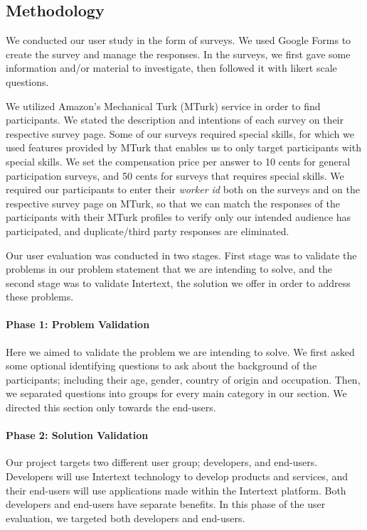 \subsection{Methodology}

We conducted our user study in the form of surveys. We used Google Forms to create the survey and manage the responses. In the surveys, we first gave some information and/or material to investigate, then followed it with likert scale questions.

We utilized Amazon's Mechanical Turk (MTurk) service in order to find participants. We stated the description and intentions of each survey on their respective survey page. Some of our surveys required special skills, for which we used features provided by MTurk that enables us to only target participants with special skills. We set the compensation price per answer to 10 cents for general participation surveys, and 50 cents for surveys that requires special skills. We required our participants to enter their \textit{worker id} both on the surveys and on the respective survey page on MTurk, so that we can match the responses of the participants with their MTurk profiles to verify only our intended audience has participated, and duplicate/third party responses are eliminated.

Our user evaluation was conducted in two stages. First stage was to validate the problems in our problem statement that we are intending to solve, and the second stage was to validate Intertext, the solution we offer in order to address these problems. 

\paragraph{Phase 1: Problem Validation}

Here we aimed to validate the problem we are intending to solve. We first asked some optional identifying questions to ask about the background of the participants; including their age, gender, country of origin and occupation. Then, we separated questions into groups for every main category in our  section. We directed this section only towards the end-users.

\paragraph{Phase 2: Solution Validation}

Our project targets two different user group; developers, and end-users. Developers will use Intertext technology to develop products and services, and their end-users will use applications made within the Intertext platform. Both developers and end-users have separate benefits. In this phase of the user evaluation, we targeted both developers and end-users. 

